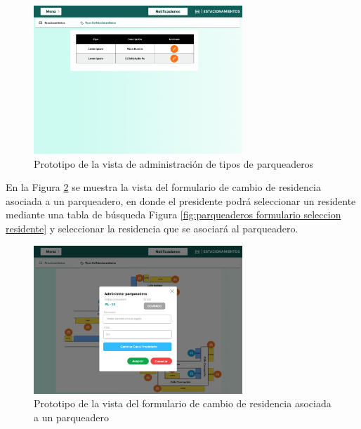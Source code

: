 \begin{figure}[H]
    \centering
    \includegraphics[width=0.7\textwidth]{resources/images/estacionamientos- type}
    \caption{Prototipo de la vista de administración de tipos de parqueaderos}
    \label{fig:parqueaderos tipos}
\end{figure}

En la Figura \ref{fig:parqueaderos formulario} se muestra la vista del formulario de cambio de residencia asociada a un parqueadero, en donde el presidente podrá seleccionar un residente mediante una tabla de búsqueda Figura \ref{fig:parqueaderos formulario seleccion residente} y seleccionar la residencia que se asociará al parqueadero.

\begin{figure}[H]
    \centering
    \includegraphics[width=0.7\textwidth]{resources/images/estacionamientos-organization-form}
    \caption{Prototipo de la vista del formulario de cambio de residencia asociada a un parqueadero}
    \label{fig:parqueaderos formulario}
\end{figure}

